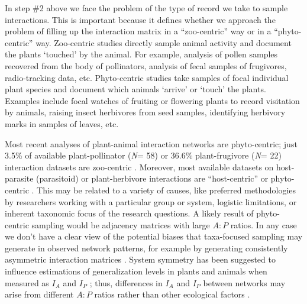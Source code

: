 \documentclass[12pt]{article}
\begin{document}

In step \#2 above we face the problem of the type of record we take to sample interactions. This is important because it defines whether we approach the problem of filling up the interaction matrix in a ``zoo-centric'' way or in a ``phyto-centric'' way. Zoo-centric studies directly sample animal activity and document the plants `touched' by the animal. For example, analysis of pollen samples recovered from the body of pollinators, analysis of fecal samples of frugivores, radio-tracking data, etc. Phyto-centric studies take samples of focal individual plant species and document which animals `arrive' or `touch' the plants. Examples include focal watches of fruiting or flowering plants to record visitation by animals, raising insect herbivores from seed samples, identifying herbivory marks in samples of leaves, etc. 

Most recent analyses of plant-animal interaction networks are phyto-centric; just 3.5\% of available plant-pollinator (\emph{N}= 58) or 36.6\% plant-frugivore (\emph{N}= 22) interaction datasets are zoo-centric \citep[see][]{Schleuning:2012eg}. Moreover, most available datasets on host-parasite (parasitoid) or plant-herbivore interactions are ``host-centric'' or phyto-centric \citep[e.g.,][]{Thebault:2010jv,Morris:2013eh,Eklof:2013ed}. This may be related to a variety of causes, like preferred methodologies by researchers working with a particular group or system, logistic limitations, or inherent taxonomic focus of the research questions. A likely result of phyto-centric sampling would be adjacency matrices with large $A:P$ ratios. In any case we don't have a clear view of the potential biases that taxa-focused sampling may generate in observed network patterns, for example by generating consistently asymmetric interaction matrices \citep{Dormann:2009aa}. System symmetry has been suggested to influence estimations of generalization levels in plants and animals when measured as $I_A$ and $I_P$ \citep{E31/5591}; thus, differences in $I_A$ and $I_P$ between networks may arise from different $A:P$ ratios rather than other ecological factors \citep{Olesen:2002wb}. 
\end{document}
